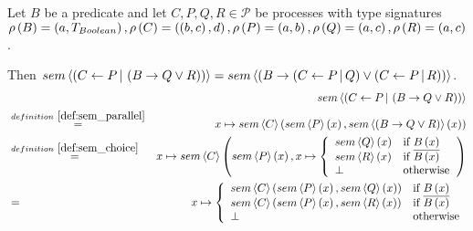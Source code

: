 \begin{myproof}
Let $B$ be a predicate and let $C, P, Q, R \in \mathcal{P}$ be processes with type signatures $\typesignature{B}{a}{T_{Boolean}}, \linebreak \typesignature{C}{\left( b, c \right)}{d}, \typesignature{P}{a}{b}, \typesignature{Q}{a}{c}, \typesignature{R}{a}{c}$.

Then $sem \left\langle \left( C \gets P \, | \, \left( B \to Q \vee R \right) \right) \right\rangle = sem \left\langle \left( B \to \left( C \gets P \, | \, Q \right) \vee \left( C \gets P \, | \, R \right) \right) \right\rangle$.
\begin{eqnarray*}
  &                                        & \sem{\parallel{C}{P}{\choice{B}{Q}{R}}} \\
  & \overset{\defref{def:sem_parallel}}{=} & x \mapsto \sem{C} \left( \sem{P} \left( x \right), \sem{\choice{B}{Q}{R}} \left( x \right) \right) \\
  & \overset{\defref{def:sem_choice}}{=}   & x \mapsto \sem{C} \left( \sem{P} \left( x \right), x \mapsto \left\{\begin{array}{ll}
                                                                                 \sem{Q} \left( x \right) & \text{if } B \left( x \right) \\
                                                                                 \sem{R} \left( x \right) & \text{if } \overline{B \left( x \right)} \\
                                                                                 \bot & \text{otherwise}
                                                                               \end{array}
                                                                        \right.\right) \\
  & =                                      & x \mapsto \left\{\begin{array}{ll}
                                                      \sem{C} \left( \sem{P} \left( x \right), \sem{Q} \left( x \right) \right) & \text{if } B \left( x \right) \\
                                                      \sem{C} \left( \sem{P} \left( x \right), \sem{R} \left( x \right) \right) & \text{if } \overline{B \left( x \right)} \\
                                                      \bot & \text{otherwise}
                                                    \end{array}
                                             \right. \\

\end{eqnarray*}
\end{myproof}
